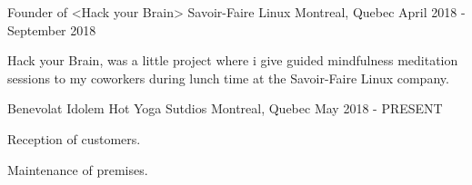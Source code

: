 

\begin{cventries}

  \cventry
    {Founder of <Hack your Brain>} %
    {Savoir-Faire Linux} %
    {Montreal, Quebec} %
    {April 2018 - September 2018} %
    {
      \begin{cvitems} %
        \item {Hack your Brain, was a little project where i give guided mindfulness meditation sessions to my coworkers during lunch time at the Savoir-Faire Linux company.}
      \end{cvitems}
    }

  \cventry
    {Benevolat} %
    {Idolem Hot Yoga Sutdios} %
    {Montreal, Quebec} %
    {May 2018 - PRESENT} %
    {
      \begin{cvitems} %
        \item {Reception of customers.}
        \item {Maintenance of premises.}
      \end{cvitems}
    }

\end{cventries}
